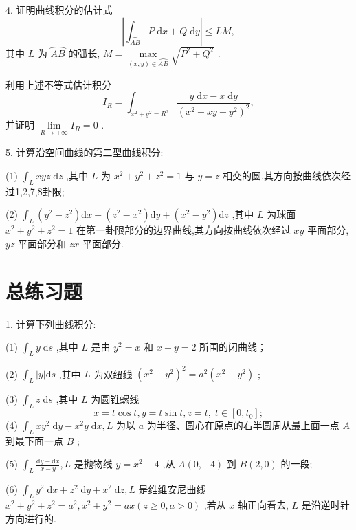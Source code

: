 4. 证明曲线积分的估计式
\[
\left| {{\int }_{\overset{⏜}{AB}}P\mathrm{\;d}x + Q\mathrm{\;d}y}\right|  \leq  {LM},
\]
其中 \(L\) 为 \(\overset{⏜}{AB}\) 的弧长, \(M = \mathop{\max }\limits_{{\left( {x,y}\right)  \in  \overset{⏜}{AB}}}\sqrt{{P}^{2} + {Q}^{2}}\) .

利用上述不等式估计积分
\[
{I}_{R} = {\int }_{{x}^{2} + {y}^{2} = {R}^{2}}\frac{y\mathrm{\;d}x - x\mathrm{\;d}y}{{\left( {x}^{2} + xy + {y}^{2}\right) }^{2}},
\]
并证明 \(\mathop{\lim }\limits_{{R \rightarrow   + \infty }}{I}_{R} = 0\) .

5. 计算沿空间曲线的第二型曲线积分:

(1) \({\int }_{L}{xyz}\mathrm{\;d}z\) ,其中 \(L\) 为 \({x}^{2} + {y}^{2} + {z}^{2} = 1\) 与 \(y = z\) 相交的圆,其方向按曲线依次经过1,2,7,8卦限;

(2) \({\int }_{L}\left( {{y}^{2} - {z}^{2}}\right) \mathrm{d}x + \left( {{z}^{2} - {x}^{2}}\right) \mathrm{d}y + \left( {{x}^{2} - {y}^{2}}\right) \mathrm{d}z\) ,其中 \(L\) 为球面 \({x}^{2} + {y}^{2} + {z}^{2} = 1\) 在第一卦限部分的边界曲线,其方向按曲线依次经过 \({xy}\) 平面部分, \({yz}\) 平面部分和 \({zx}\) 平面部分.

\section{总练习题}

1. 计算下列曲线积分:

(1) \({\int }_{L}y\mathrm{\;d}s\) ,其中 \(L\) 是由 \({y}^{2} = x\) 和 \(x + y = 2\) 所围的闭曲线；

(2) \({\int }_{L}\left| y\right| \mathrm{d}s\) ,其中 \(L\) 为双纽线 \({\left( {x}^{2} + {y}^{2}\right) }^{2} = {a}^{2}\left( {{x}^{2} - {y}^{2}}\right)\) ;

(3) \({\int }_{L}z\mathrm{\;d}s\) ,其中 \(L\) 为圆锥螺线
\[
x = t\cos t,y = t\sin t,z = t,\;t \in  \left\lbrack  {0,{t}_{0}}\right\rbrack  ;
\]
(4) \({\int }_{L}x{y}^{2}\mathrm{\;d}y - {x}^{2}y\mathrm{\;d}x,L\) 为以 \(a\) 为半径、圆心在原点的右半圆周从最上面一点 \(A\) 到最下面一点 \(B\) ;

(5) \({\int }_{L}\frac{\mathrm{d}y - \mathrm{d}x}{x - y},L\) 是抛物线 \(y = {x}^{2} - 4\) ,从 \(A\left( {0, - 4}\right)\) 到 \(B\left( {2,0}\right)\) 的一段;

(6) \({\int }_{L}{y}^{2}\mathrm{\;d}x + {z}^{2}\mathrm{\;d}y + {x}^{2}\mathrm{\;d}z,L\) 是维维安尼曲线 \({x}^{2} + {y}^{2} + {z}^{2} = {a}^{2},{x}^{2} + {y}^{2} = {ax}\left( {z \geq  0,a > 0}\right)\) ,若从 \(x\) 轴正向看去, \(L\) 是沿逆时针方向进行的.

